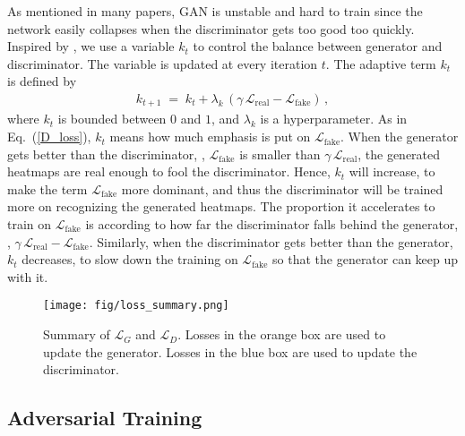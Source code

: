 \documentclass[10pt,twocolumn,letterpaper]{article}
\begin{document}
As mentioned in many papers, GAN is unstable and hard to train since the network easily collapses when the discriminator gets too good too quickly. Inspired by \cite{BerthelotSM17}, we use a variable $k_{t}$ to control the balance between generator and discriminator. The variable is updated at every iteration $t$. The adaptive term $k_{t}$ is defined by 
\begin{equation}
	\begin{aligned}	
		k_{t+1}\;=\;k_{t}+\lambda_{k}\,(\gamma\,\mathcal{L}_{\mathrm{real}}-\mathcal{L}_{\mathrm{fake}}) \,,
	\end{aligned}
\end{equation}
where $k_{t}$ is bounded between $0$ and $1$, and $\lambda_{k}$ is a hyperparameter. As in Eq.~(\ref{D_loss}), $k_{t}$ means how much emphasis is put on $\mathcal{L}_{\mathrm{fake}}$. When the generator gets better than the discriminator,  \ie, $\mathcal{L}_{\mathrm{fake}}$ is smaller than $\gamma\,\mathcal{L}_{\mathrm{real}}$, the generated heatmaps are real enough to fool the discriminator. Hence, $k_{t}$ will increase, to make the term  $\mathcal{L}_{\mathrm{fake}}$ more dominant, and thus the discriminator will be trained more on recognizing the generated heatmaps. The proportion it accelerates to train on $\mathcal{L}_{\mathrm{fake}}$ is according to how far the discriminator falls behind the generator, \ie, $\gamma\,\mathcal{L}_{\mathrm{real}}-\mathcal{L}_{\mathrm{fake}}$. Similarly, when the discriminator gets better than the generator, $k_{t}$ decreases, to slow down the training on $\mathcal{L}_{\mathrm{fake}}$ so that the generator can keep up with it.


\begin{figure*}[tb]
    \centering
    \texttt{[image: fig/loss\_summary.png]}
    \caption{ Summary of $\mathcal{L}_{G}$ and $\mathcal{L}_{D}$. Losses in the orange box are used to update the generator. Losses in the blue box are used to update the discriminator.}
    \label{fig:loss_summary}
\end{figure*}



\subsection{Adversarial Training}
\end{document}
